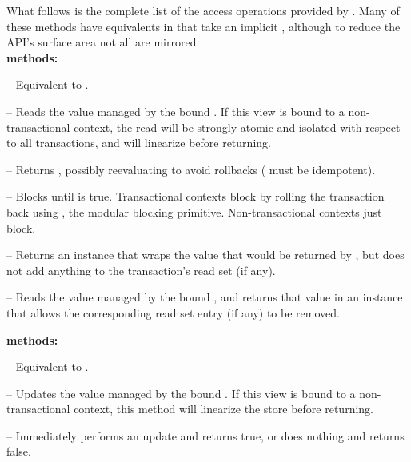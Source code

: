What follows is the complete list of the access operations provided by
.  Many of these methods have equivalents in 
that take an implicit , although to reduce the API's surface
area not all are mirrored. \vspace{4pt}\\
\textbf{ methods:}
\begin{packed_itemize}

\item {} -- Equivalent to .

\item {} -- Reads the value managed by the
bound .  If this view is bound to a non-transactional context,
the read will be strongly atomic and isolated with respect to all
transactions, and will linearize before returning.

\item \code{map[}\typeparam{Z}{](f: }
-- Returns , possibly reevaluating 
to avoid rollbacks ( must be idempotent).

\item {}\code{)} -- Blocks
until  is true.  Transactional contexts block by rolling
the transaction back using , the modular blocking primitive.
Non-transactional contexts just block.

\item {}\code{[}\typeparam{T}{]}
-- Returns an instance that wraps the value that would be returned by
, but does not add anything to the transaction's read set
(if any).

\item {}\code{[}\typeparam{T}{]}
-- Reads the value managed by the bound , and returns that
value in an instance that allows the corresponding read set entry (if any)
to be removed.

\end{packed_itemize}
\textbf{ methods:}
\begin{packed_itemize}

\item {} -- Equivalent to .

\item {} -- Updates the value managed by the
bound .  If this view is bound to a non-transactional context,
this method will linearize the store before returning.

\item {} -- Immediately
performs an update and returns true, or does nothing and returns false.

\end{packed_itemize}

